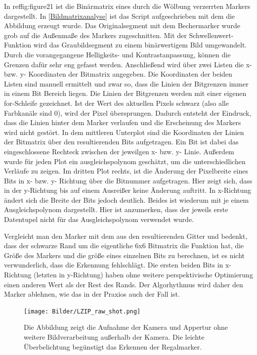     In ref{fig:figure21} ist die Binärmatrix eines durch die Wölbung verzerrten Markers dargestellt. In \ref{Bildmatrixanalyse} ist das Script aufgeschrieben mit dem die Abbildung erzeugt wurde.
    Das Originalsegment mit dem Bechermarker wurde grob auf die Außenmaße des Markers zugeschnitten. 
    Mit der Schwellenwert-Funktion wird das Graubildsegment zu einem binärwertigem Bild umgewandelt.
    Durch die vorangegangene Helligkeits- und Kontrastanpassung, können die Grenzen dafür sehr eng gefasst werden.
    Anschließend wird über zwei Listen die x- bzw. y- Koordinaten der Bitmatrix angegeben. 
    Die Koordinaten der beiden Listen sind manuell ermittelt und zwar so, dass die Linien der Bitgrenzen immer in einem Bit Bereich liegen.
    Die Linien der Bitgrenzen werden mit einer eigenen for-Schleife gezeichnet. Ist der Wert des aktuellen Pixels schwarz (also alle Farbkanäle sind 0), wird der Pixel übersprungen. 
    Dadurch entsteht der Eindruck, dass die Linien hinter dem Marker verlaufen und die Erscheinung des Markers wird nicht gestört. 
    In dem mittleren Unterplot sind die Koordinaten der Linien der Bitmatrix über den resultierenden Bits aufgetragen. 
    Ein Bit ist dabei das eingeschlossene Rechteck zwischen der jeweilgen x- bzw. y- Linie. Außerdem wurde für jeden Plot ein ausgleichspolynom geschätzt, um die unterschiedlichen Verläufe zu zeigen. 
    Im dritten Plot rechts, ist die Änderung der Pixelbreite eines Bits in x- bzw. y- Richtung über die Bitnummer aufgetragen.
    Hier zeigt sich, dass in der y-Richtung bis auf einem Ausreißer keine Änderung auftritt. In x-Richtung ändert sich die Breite der Bits jedoch deutlich.
    Beides ist wiederum mit je einem Ausgleichspolynom dargestellt. Hier ist anzumerken, dass der jeweils erste Datentupel nicht für das Ausgleichspolynom verwendet wurde. 

    Vergleicht man den Marker mit dem aus den resultierenden Gitter und bedenkt, dass der schwarze Rand um die eigentliche 6x6 Bitmatrix die Funktion hat, die Größe des Markers und die größe eines einzelnen Bits zu berechnen, 
    ist es nicht verwunderlich, dass die Erkennung fehlschlägt. Die ersten beiden Bits in x-Richtung (letzten in y-Richtung) haben ohne weitere perspektivische Optimierung einen anderen Wert als der Rest des Rands. 
    Der Algorhythmus wird daher den Marker ablehnen, wie das in der Praxios auch der Fall ist.

    \begin{figure}
        \caption[Bildaufnahme aus der Lagerzelle von der Übersichtskamera.]
        {\small Die Abbildung zeigt die Aufnahme der Kamera und Appertur ohne weitere Bildverarbeitung außerhalb der Kamera. Die leichte Überbelichtung begünstigt das Erkennen der Regalmarker.}\label{fig:figure12}
        \texttt{[image: Bilder/LZIP\_raw\_shot.png]}
        \centering
    \end{figure}

